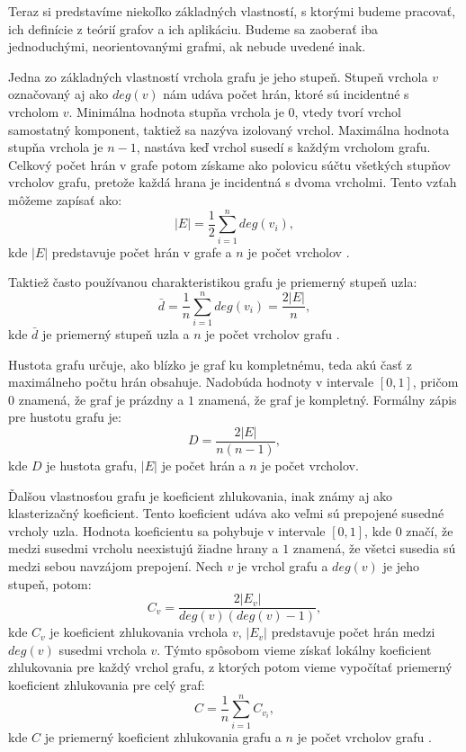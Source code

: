 Teraz si predstavíme niekoľko základných vlastností, s ktorými budeme pracovať, ich definície z teórií grafov a ich aplikáciu. Budeme sa zaoberať iba
jednoduchými, neorientovanými grafmi, ak nebude uvedené inak.

Jedna zo základných vlastností vrchola grafu je jeho stupeň. Stupeň vrchola $v$ označovaný aj ako $deg(v)$ nám udáva počet hrán,
ktoré sú incidentné s vrcholom $v$. Minimálna hodnota stupňa vrchola je $0$, vtedy tvorí vrchol samostatný komponent, taktiež sa
nazýva izolovaný vrchol. Maximálna hodnota stupňa vrchola je $n-1$, nastáva keď vrchol susedí s každým vrcholom grafu.
Celkový počet hrán v grafe potom získame ako polovicu súčtu všetkých stupňov vrcholov grafu,
pretože každá hrana je incidentná s dvoma vrcholmi. Tento vzťah môžeme zapísať ako:
\begin{equation}
    |E| = \frac{1}{2} \sum_{i=1}^{n} deg(v_i),
    \label{eq:pocet_hran}
\end{equation}
kde $|E|$ predstavuje počet hrán v grafe a $n$ je počet vrcholov \cite{barabasi2016network} .

Taktiež často používanou charakteristikou grafu je priemerný stupeň uzla:
\begin{equation}
    \bar{d} = \frac{1}{n} \sum_{i=1}^{n} deg(v_i) = \frac{2|E|}{n},
    \label{eq:priemerny_stupen}
\end{equation}
kde $\bar{d}$ je priemerný stupeň uzla a $n$ je počet vrcholov grafu \cite{barabasi2016network} .

Hustota grafu určuje, ako blízko je graf ku kompletnému, teda akú časť z maximálneho počtu hrán obsahuje.
Nadobúda hodnoty v intervale $[0, 1]$, pričom $0$ znamená, že graf je prázdny a $1$ znamená, že graf je kompletný.
Formálny zápis pre hustotu grafu je:
\begin{equation}
    D = \frac{2|E|}{n(n-1)},
    \label{eq:hustota}
\end{equation}
kde $D$ je hustota grafu, $|E|$ je počet hrán a $n$ je počet vrcholov.

Ďalšou vlastnosťou grafu je koeficient zhlukovania, inak známy aj ako klasterizačný koeficient.
Tento koeficient udáva ako veľmi sú prepojené susedné vrcholy uzla. Hodnota koeficientu sa pohybuje v intervale $[0, 1]$,
kde $0$ značí, že medzi susedmi vrcholu neexistujú žiadne hrany a $1$ znamená, že všetci susedia sú medzi sebou navzájom prepojení.
Nech $v$ je vrchol grafu a $deg(v)$ je jeho stupeň, potom:
\begin{equation}
    C_v = \frac{2|E_v|}{deg(v)(deg(v)-1)},
    \label{eq:koeficient_zhlukovania_local}
\end{equation}
kde $C_v$ je koeficient zhlukovania vrchola $v$, $|E_v|$ predstavuje počet hrán medzi $deg(v)$ susedmi vrchola $v$. 
Týmto spôsobom vieme získať lokálny koeficient zhlukovania pre každý vrchol grafu, z ktorých potom vieme vypočítať
priemerný koeficient zhlukovania pre celý graf:
\begin{equation}
    C = \frac{1}{n} \sum_{i=1}^{n} C_{v_i},
    \label{eq:koeficient_zhlukovania_global}
\end{equation}
kde $C$ je priemerný koeficient zhlukovania grafu a $n$ je počet vrcholov grafu \cite{barabasi2016network} .

